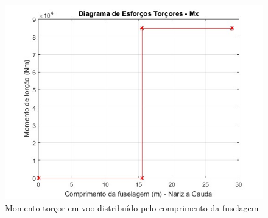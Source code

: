 \begin{figure}
\centering
\includegraphics[width=\textwidth]{cargas/imagens/torc_FUSV.jpg}
\caption{Momento torçor em voo distribuído pelo comprimento da fuselagem}
\label{fig:torc_FUSV}
\end{figure}
